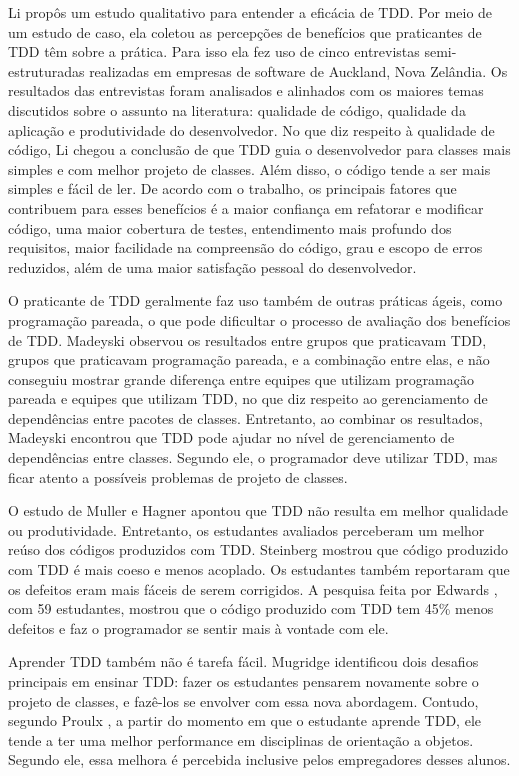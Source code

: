 Li \cite{angela-li} propôs um estudo qualitativo para
entender a eficácia de TDD. Por meio de um estudo de caso, ela coletou as 
percepções de benefícios que praticantes de TDD têm sobre a prática. Para isso ela
fez uso de cinco entrevistas semi-estruturadas realizadas em empresas de software de 
Auckland, Nova Zelândia. Os resultados das entrevistas foram analisados e alinhados
com os maiores temas discutidos sobre o assunto na literatura: qualidade de código,
qualidade da aplicação e produtividade do desenvolvedor.
No que diz respeito à qualidade de código, Li chegou a conclusão de
que TDD guia o desenvolvedor para classes mais simples e com melhor projeto de classes. 
Além disso, o código tende a ser mais simples e fácil de ler.
De acordo com o trabalho, os principais fatores que contribuem para esses benefícios
é a maior confiança em refatorar e modificar código, uma maior cobertura de testes,
entendimento mais profundo dos requisitos, maior facilidade na compreensão do código,
grau e escopo de erros reduzidos, além de uma maior satisfação pessoal do desenvolvedor.

O praticante de TDD geralmente faz uso também de outras práticas ágeis, como
programação pareada, o que pode dificultar o processo de avaliação dos benefícios
de TDD. Madeyski \cite{madeyski-package-dependencies} observou os resultados
entre grupos que praticavam TDD, grupos que praticavam programação pareada, 
e a combinação entre elas,
e não conseguiu mostrar grande diferença entre equipes que utilizam programação 
pareada e equipes que utilizam TDD, no que diz respeito ao gerenciamento de dependências entre 
pacotes de classes. Entretanto, ao combinar os resultados, Madeyski encontrou que TDD pode 
ajudar no nível de gerenciamento de dependências entre classes. Segundo ele, o 
programador deve utilizar TDD, mas ficar atento a possíveis problemas de projeto de classes.

O estudo de Muller e Hagner \cite{muller-e-hagner} apontou que TDD não resulta
em melhor qualidade ou produtividade. Entretanto, os estudantes avaliados perceberam um 
melhor reúso dos códigos produzidos com TDD. Steinberg \cite{steinberg} mostrou
que código produzido com TDD é mais coeso e menos acoplado. Os estudantes também
reportaram que os defeitos eram mais fáceis de serem corrigidos. A pesquisa feita
por Edwards \cite{edwards}, com 59 estudantes, mostrou que o código produzido com
TDD tem 45\% menos defeitos e faz o programador se sentir mais à vontade
com ele.

Aprender TDD também não é tarefa fácil. Mugridge \cite{mugridge} identificou
dois desafios principais em ensinar TDD: fazer os estudantes
pensarem novamente sobre o projeto de classes, e fazê-los se envolver com essa nova
abordagem. 
Contudo, segundo Proulx \cite{proulx}, a partir do momento em que
o estudante aprende TDD, ele tende a ter uma melhor performance em disciplinas
de orientação a objetos. Segundo ele, essa melhora é percebida inclusive pelos
empregadores desses alunos. 

